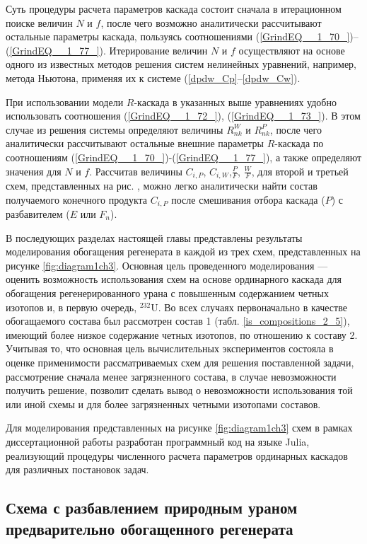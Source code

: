 Суть процедуры расчета параметров каскада состоит сначала в итерационном поиске величин $N$ и $f$, после чего возможно аналитически рассчитывают остальные параметры каскада, пользуясь соотношениями (\ref{GrindEQ__1_70_})--(\ref{GrindEQ__1_77_}). Итерирование величин $N$ и $f$ осуществляют на основе одного из известных методов решения систем нелинейных уравнений, например, метода Ньютона, применяя их к системе (\ref{dpdw_Cp}--\ref{dpdw_Cw}). 

При использовании модели $R$-каскада в указанных выше уравнениях удобно использовать соотношения (\ref{GrindEQ__1_72_}), (\ref{GrindEQ__1_73_}). В этом случае из решения системы определяют величины $R_{n k}^{W}$ и $R_{n k}^{P}$, после чего аналитически рассчитывают остальные внешние параметры $R$-каскада по соотношениям (\ref{GrindEQ__1_70_})-(\ref{GrindEQ__1_77_}), а также определяют значения для $N$ и $f$. Рассчитав величины ${C}_{i,P}$, ${C}_{i,W}$,$\frac{P}{F}$, $\frac{W}{F}$, для второй и третьей схем, представленных на рис. \label{fig:diagram1ch3}, можно легко аналитически найти состав получаемого конечного продукта ${C}_{i,P}$ после смешивания отбора каскада ($P$) с разбавителем ($E$ или $F_n$).

В последующих разделах настоящей главы представлены результаты моделирования обогащения регенерата в каждой из трех схем, представленных на рисунке \ref{fig:diagram1ch3}. 
Основная цель проведенного моделирования --- оценить возможность использования схем на основе ординарного каскада для обогащения регенерированного урана с повышенным содержанием четных изотопов и, в первую очередь, $^{232}$U. Во всех случаях первоначально в качестве обогащаемого состава был рассмотрен состав 1 (табл. \ref{is_compositions_2_5}), имеющий более низкое содержание четных изотопов, по отношению к составу 2. Учитывая то, что основная цель вычислительных экспериментов состояла в оценке применимости рассматриваемых схем для решения поставленной задачи, рассмотрение сначала менее загрязненного состава, в случае невозможности получить решение, позволит сделать вывод о невозможности использования той или иной схемы и для более загрязненных четными изотопами составов.

Для моделирования представленных на рисунке \ref{fig:diagram1ch3} схем в рамках диссертационной работы разработан программный код на языке Julia, реализующий процедуры численного расчета параметров ординарных каскадов для различных постановок задач.

\subsection{Схема с разбавлением природным ураном предварительно обогащенного регенерата}

